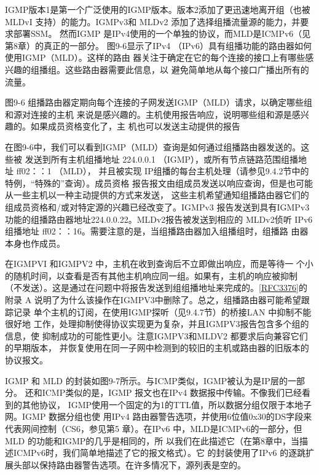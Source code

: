 IGMP版本1是第一个广泛使用的IGMP版本。版本2添加了更迅速地离开组（也被
MLDvI 支持）的能力。IGMPv3和 MLDv2 添加了选择组播流量源的能力，并要求部署SSM。
然而IGMP 是IPv4使用的一个单独的协议，而MLD是ICMPv6（见第8章）的真正的一部分。
图9-6显示了IPv4 （IPv6）具有组播功能的路由器如何使用IGMP（MLD）。这样的路由
器关注于确定在它的每个连接的接口上有哪些感兴趣的组播组。这些路由器需要此信息，以
避免简单地从每个接口广播出所有的流量。

图9-6 组播路由器定期向每个连接的子网发送IGMP（MLD）请求，以确定哪些组和源对连接的主机
来说是感兴趣的。主机使用报告响应，说明哪些组和源是感兴趣的。如果成员资格变化了，主
机也可以发送主动提供的报告

在图9-6中，我们可以看到IGMP（MLD）查询是如何通过组播路由器发送的。这些被
发送到所有主机组播地址 224.0.0.1 （IGMP），或所有节点链路范围组播地址 ff02：：1 （MLD），
并且被实现 IP组播的每台主机处理（请参见9.4.2节中的特例，“特殊的”查询）。成员资格
报告报文由组成员发送以响应查询，但是也可能从一些主机以一种主动提供的方式来发送，
这些主机希望通知组播路由器它们的组成员资格和/或对特定源的兴趣已经改变了。IGMPv3
报告发送到具有IGMPv3功能的组播路由器地址224.0.0.22。MLDv2报告被发送到相应的
MLDv2侦听 IPv6 组播地址 ff02：：16。需要注意的是，当组播路由器加入组播组时，组播路
由器本身也作成员。


\begin{tcolorbox}
    在IGMPVI 和IGMPV2 中，主机在收到查询后不立即做出响应，而是等待一
    个小的随机时间，以查看是否有其他主机响应同一组。如果有，主机的响应被抑制
    （不发送）。这是通过在问题中将报告发送到组组播地址来完成的。\href{https://www.rfc-editor.org/rfc/rfc3376}{[RFC3376]}的附录
    A 说明了为什么该操作在IGMPV3中删除了。总之，组播路由器可能希望跟踪记录
    单个主机的订阅，在使用IGMP探听（见9.4.7节）的桥接LAN 中抑制不能很好地
    工作，处理抑制使得协议实现更为复杂，并且IGMPV3报告包含多个组的信息，使
    抑制成功的可能性更小。注意IGMPV3和MLDV2 都要求后向兼容它们的早期版本，
    并恢复使用在同一子网中检测到的较旧的主机或路由器的旧版本的协议报文。
\end{tcolorbox}

IGMP 和 MLD 的封装如图9-7所示。与ICMP类似，IGMP被认为是IP层的一部分。
还和ICMP类似的是，IGMP 报文也在IPv4 数据报中传输。不像我们已经看到的其他协议，
IGMP使用一个固定的为1的TTL值，所以数据分组仅限于本地子网。IGMP 数据分组也使
用IPv4 路由器警告选项，并使用6位值0x30的DS字段来代表网间控制（CS6，参见第5
章）。在IPv6 中，MLD是ICMPv6的一部分，但 MLD 的功能和IGMP的几乎是相同的，所
以我们在此描述它（在第8章中，当描述ICMPv6时，我们简单地描述了它的报文格式）。它
的封装使用了IPv6 的逐跳扩展头部以保持路由器警告选项。在许多情况下，源列表是空的。

